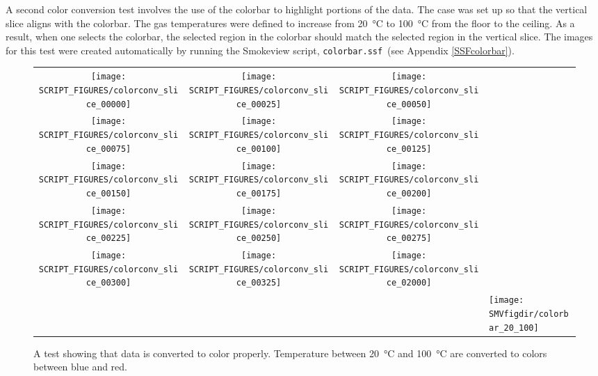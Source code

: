 \documentclass[11pt,twoside]{book}
\begin{document}
A second color conversion test involves the use of the colorbar to highlight
portions of the data.  The case was set up so that the vertical slice aligns
with the colorbar.  The gas temperatures were defined to increase from
\SI{20}{\degreeCelsius} to \SI{100}{\degreeCelsius} from the floor to the ceiling.
As a result, when one selects the colorbar, the selected region in the colorbar
should match the selected region in the vertical slice. The images for this
test were created automatically by running the Smokeview script, {\tt colorbar.ssf}\
(see Appendix \ref{SSFcolorbar}).

\begin{figure}[bph]
\begin{center}
\begin{tabular}{cccl}
 \texttt{[image: SCRIPT\_FIGURES/colorconv\_slice\_00000]}&
 \texttt{[image: SCRIPT\_FIGURES/colorconv\_slice\_00025]}&
 \texttt{[image: SCRIPT\_FIGURES/colorconv\_slice\_00050]}\\
 \texttt{[image: SCRIPT\_FIGURES/colorconv\_slice\_00075]}&
 \texttt{[image: SCRIPT\_FIGURES/colorconv\_slice\_00100]}&
 \texttt{[image: SCRIPT\_FIGURES/colorconv\_slice\_00125]}\\
 \texttt{[image: SCRIPT\_FIGURES/colorconv\_slice\_00150]}&
 \texttt{[image: SCRIPT\_FIGURES/colorconv\_slice\_00175]}&
 \texttt{[image: SCRIPT\_FIGURES/colorconv\_slice\_00200]}\\
 \texttt{[image: SCRIPT\_FIGURES/colorconv\_slice\_00225]}&
 \texttt{[image: SCRIPT\_FIGURES/colorconv\_slice\_00250]}&
 \texttt{[image: SCRIPT\_FIGURES/colorconv\_slice\_00275]}\\
 \texttt{[image: SCRIPT\_FIGURES/colorconv\_slice\_00300]}&
 \texttt{[image: SCRIPT\_FIGURES/colorconv\_slice\_00325]}&
 \texttt{[image: SCRIPT\_FIGURES/colorconv\_slice\_02000]}\\
&&&\raisebox{0.0in}[0pt]{\texttt{[image: \\SMVfigdir/colorbar\_20\_100]}}\\
\end{tabular}
\end{center}
 \caption[A test showing that data is converted to color properly]{
 A test showing that data is converted to color properly.  Temperature
 between \SI{20}{\degreeCelsius} and \SI{100}{\degreeCelsius} are
 converted to colors between blue and red.}
\label{figcolorconv}%
\end{figure}
\end{document}
